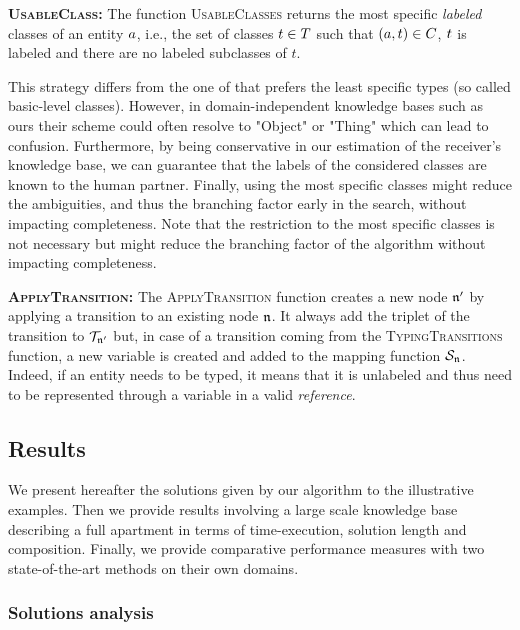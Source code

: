 \documentclass[a4paper,11pt,twoside]{StyleThese}
\begin{document}
\textbf{\textsc{UsableClass}:}
The function \textsc{UsableClasses} returns the most specific \textit{labeled} classes of an entity $a$, i.e., the set of classes $t \in T$ such that $(a, t) \in C$, $t$ is labeled and there are no labeled subclasses of $t$.

This strategy differs from the one of \cite{dale1995computational} that prefers the least specific types (so called basic-level classes).
However, in domain-independent knowledge bases such as ours their scheme could often resolve to "Object" or "Thing" which can lead to confusion.
Furthermore, by being conservative in our estimation of the receiver's knowledge base, we can guarantee that the labels of the considered classes are known to the human partner.
Finally, using the most specific classes might reduce the ambiguities, and thus the branching factor early in the search, without impacting completeness.
Note that the restriction to the most specific classes is not necessary but might reduce the branching factor of the algorithm without impacting completeness.

\textbf{\textsc{ApplyTransition}:}
The \textsc{ApplyTransition} function creates a new node $\mathfrak{n}'$ by applying a transition to an existing node $\mathfrak{n}$. It always add the triplet of the transition to $\mathcal{T}_{\mathfrak{n}'}$ but, in case of a transition coming from the \textsc{TypingTransitions} function, a new variable is created and added to the mapping function $\mathcal{S}_{\mathfrak{n}}$. Indeed, if an entity needs to be typed, it means that it is unlabeled and thus need to be represented through a variable in a valid \textit{reference}.

\subsection{Results}
We present hereafter the solutions given by our algorithm to the illustrative examples. Then we provide results involving a large scale knowledge base describing a full apartment in terms of time-execution, solution length and composition. Finally, we provide comparative performance measures with two state-of-the-art methods on their own domains.

\subsubsection{Solutions analysis}
\end{document}
